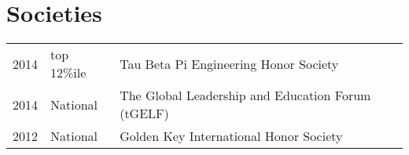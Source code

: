 \documentclass[]{deedy-resume-openfont}
\begin{document}
\begin{minipage}[t]{0.66\textwidth}
    \section{Societies} 
        \begin{tabular}{rll}
            2014 & top 12\%ile & Tau Beta Pi Engineering Honor Society\\
            2014 & National    & The Global Leadership and Education Forum (tGELF)\\
            2012 & National    & Golden Key International Honor Society\\
        \end{tabular}
    \sectionsep

\end{minipage}
\end{document}
